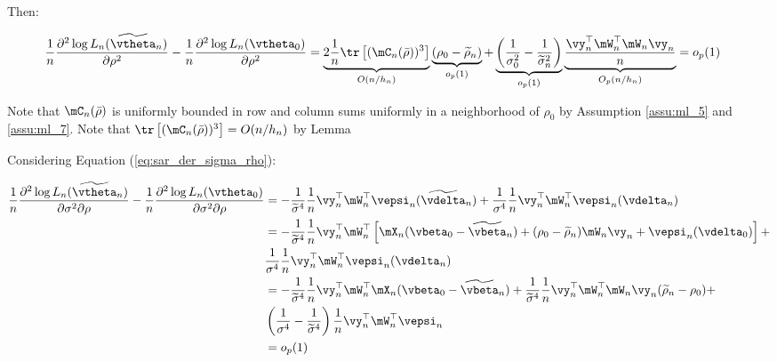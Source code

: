 \begin{subappendices}
\begin{enumerate}
   Then:
   
   \begin{equation*}
    \begin{aligned}
    \frac{1}{n}\frac{\partial^2 \log L_n(\widetilde{\vtheta}_n)}{\partial \rho^2} - \frac{1}{n}\frac{\partial^2 \log L_n(\vtheta_0)}{\partial\rho^2} & = \underbrace{2\frac{1}{n}\tr\left[(\mC_n(\bar{\rho}))^3\right]}_{O(n/h_n)} \underbrace{(\rho_0 - \widetilde{\rho}_n)}_{o_p(1)} + \underbrace{\left(\frac{1}{\sigma^2_0} - \frac{1}{\widetilde{\sigma}^2_n}\right)}_{o_p(1)}\underbrace{\frac{\vy_n^{\top}\mW^{\top}_n\mW_n\vy_n}{n}}_{O_p(n/h_n)} = o_p(1)
    \end{aligned}
   \end{equation*}
   
   Note that $\mC_n(\bar{\rho})$ is uniformly bounded in row and column sums uniformly in a neighborhood of $\rho_0$ by  Assumption \ref{assu:ml_5} and \ref{assu:ml_7}. Note that $\tr\left[(\mC_n(\bar{\rho}))^3\right] = O(n/h_n)$ by Lemma 
   
  Considering Equation (\ref{eq:sar_der_sigma_rho}):
   
   
    \begin{equation*}
    \begin{aligned}
    \frac{1}{n}\frac{\partial^2 \log L_n(\widetilde{\vtheta}_n)}{\partial \sigma^2 \partial \rho} - \frac{1}{n}\frac{\partial^2 \log L_n(\vtheta_0)}{\partial \sigma^2 \partial \rho}& = -\frac{1}{\widetilde{\sigma}^4}\frac{1}{n}\vy_n^\top\mW_n^\top\vepsi_n(\widetilde{\vdelta}_n) + \frac{1}{\sigma^4}\frac{1}{n}\vy_n^\top\mW_n^\top\vepsi_n(\vdelta_n)\\
    & = -\frac{1}{\widetilde{\sigma}^4}\frac{1}{n}\vy_n^\top\mW_n^\top\left[\mX_n(\vbeta_0 - \widetilde{\vbeta}_n) + (\rho_0 - \widetilde{\rho}_n)\mW_n\vy_n + \vepsi_n(\vdelta_0)\right] + \\
    &  \frac{1}{\sigma^4}\frac{1}{n}\vy_n^\top\mW_n^\top\vepsi_n(\vdelta_n) \\
    &= -\frac{1}{\widetilde{\sigma}^4}\frac{1}{n}\vy_n^\top\mW_n^\top\mX_n(\vbeta_0 - \widetilde{\vbeta}_n)  + \frac{1}{\widetilde{\sigma}^4}\frac{1}{n}\vy_n^\top\mW_n^\top\mW_n\vy_n(\widetilde{\rho}_n-\rho_0) + \\
    & \left(\frac{1}{\sigma^4}-\frac{1}{\widetilde{\sigma}^4}\right)\frac{1}{n}\vy_n^\top\mW_n^\top\vepsi_{n} \\
    & = o_p(1)
    \end{aligned}
   \end{equation*}
   

\end{enumerate}
\end{subappendices}
